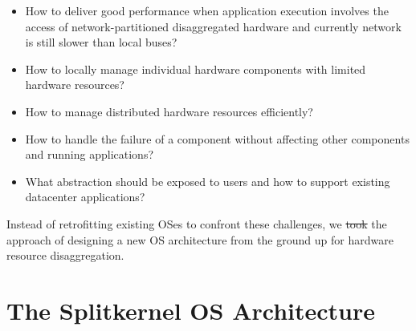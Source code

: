 \documentclass[10pt,times,twocolumn]{z2-article}
\providecommand{\DIFaddtex}[1]{{\protect\color{blue}\uwave{#1}}} %
\providecommand{\DIFdeltex}[1]{{\protect\color{red}\sout{#1}}}                      %
\providecommand{\DIFaddbegin}{} %
\providecommand{\DIFaddend}{} %
\providecommand{\DIFdelbegin}{} %
\providecommand{\DIFdelend}{} %
\providecommand{\DIFadd}[1]{\texorpdfstring{\DIFaddtex{#1}}{#1}} %
\providecommand{\DIFdel}[1]{\texorpdfstring{\DIFdeltex{#1}}{}} %
\newcommand{\DIFscaledelfig}{0.5}
\newlength{\DIFdelgraphicswidth} %
\newlength{\DIFdelgraphicsheight} %
\newcommand{\DIFaddincludegraphics}[2][]{{\color{blue}\fbox{\DIFOincludegraphics[#1]{#2}}}} %
\newcommand{\DIFdelincludegraphics}[2][]{%
\sbox{\DIFdelgraphicsbox}{\DIFOincludegraphics[#1]{#2}}%
\settoboxwidth{\DIFdelgraphicswidth}{\DIFdelgraphicsbox} %
\settoboxtotalheight{\DIFdelgraphicsheight}{\DIFdelgraphicsbox} %
\scalebox{\DIFscaledelfig}{%
\parbox[b]{\DIFdelgraphicswidth}{\usebox{\DIFdelgraphicsbox}\\[-\baselineskip] \rule{\DIFdelgraphicswidth}{0em}}\llap{\resizebox{\DIFdelgraphicswidth}{\DIFdelgraphicsheight}{%
\setlength{\unitlength}{\DIFdelgraphicswidth}%
\begin{picture}(1,1)%
\thicklines\linethickness{2pt} %
{\color[rgb]{1,0,0}\put(0,0){\framebox(1,1){}}}%
{\color[rgb]{1,0,0}\put(0,0){\line( 1,1){1}}}%
{\color[rgb]{1,0,0}\put(0,1){\line(1,-1){1}}}%
\end{picture}%
}\hspace*{3pt}}} %
} %
\DeclareRobustCommand{\DIFaddbegin}{\DIFOaddbegin \let\includegraphics\DIFaddincludegraphics} %
\DeclareRobustCommand{\DIFaddend}{\DIFOaddend \let\includegraphics\DIFOincludegraphics} %
\DeclareRobustCommand{\DIFdelbegin}{\DIFOdelbegin \let\includegraphics\DIFdelincludegraphics} %
\DeclareRobustCommand{\DIFdelend}{\DIFOaddend \let\includegraphics\DIFOincludegraphics} %
\begin{document}
{\begin{itemize}
\vspace{-0.05in}
\item How to deliver good performance when application execution involves the access of network-partitioned disaggregated hardware
and currently network is still slower than local buses?

\vspace{-0.05in}
\item How to locally manage individual hardware components with limited hardware resources?


\vspace{-0.05in}
\item How to manage distributed hardware resources efficiently?

\vspace{-0.05in}
\item How to handle the failure of a component without affecting other components and running applications?

\vspace{-0.05in}
\item What abstraction should be exposed to users and how to support existing datacenter applications?

\vspace{-0.05in}
\end{itemize}

Instead of retrofitting existing OSes to confront these challenges,
we \DIFdelbegin \DIFdel{took }\DIFdelend \DIFaddbegin \DIFadd{take }\DIFaddend the approach of designing a new OS architecture from the ground up for hardware resource disaggregation.
\DIFdelbegin %

\section{The Splitkernel OS Architecture}
\label{sec:design}

}
\end{document}
